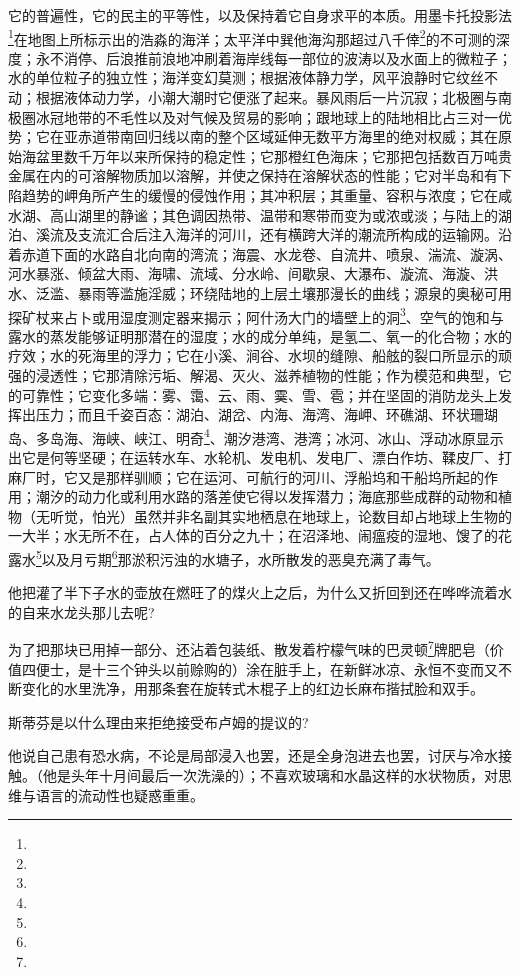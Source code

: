 \par 它的普遍性，它的民主的平等性，以及保持着它自身求平的本质。用墨卡托投影法\footnote{}在地图上所标示出的浩淼的海洋；太平洋中巽他海沟那超过八千倖\footnote{}的不可测的深度；永不消停、后浪推前浪地冲刷着海岸线每一部位的波涛以及水面上的微粒子；水的单位粒子的独立性；海洋变幻莫测；根据液体静力学，风平浪静时它纹丝不动；根据液体动力学，小潮大潮时它便涨了起来。暴风雨后一片沉寂；北极圈与南极圈冰冠地带的不毛性以及对气候及贸易的影响；跟地球上的陆地相比占三对一优势；它在亚赤道带南回归线以南的整个区域延伸无数平方海里的绝对权威；其在原始海盆里数千万年以来所保持的稳定性；它那橙红色海床；它那把包括数百万吨贵金属在内的可溶解物质加以溶解，并使之保持在溶解状态的性能；它对半岛和有下陷趋势的岬角所产生的缓慢的侵蚀作用；其冲积层；其重量、容积与浓度；它在咸水湖、高山湖里的静谧；其色调因热带、温带和寒带而变为或浓或淡；与陆上的湖泊、溪流及支流汇合后注入海洋的河川，还有横跨大洋的潮流所构成的运输网。沿着赤道下面的水路自北向南的湾流；海震、水龙卷、自流井、喷泉、湍流、漩涡、河水暴涨、倾盆大雨、海啸、流域、分水岭、间歇泉、大瀑布、漩流、海漩、洪水、泛滥、暴雨等滥施淫威；环绕陆地的上层土壤那漫长的曲线；源泉的奥秘可用探矿杖来占卜或用湿度测定器来揭示；阿什汤大门的墙壁上的洞\footnote{}、空气的饱和与露水的蒸发能够证明那潜在的湿度；水的成分单纯，是氢二、氧一的化合物；水的疗效；水的死海里的浮力；它在小溪、涧谷、水坝的缝隙、船舷的裂口所显示的顽强的浸透性；它那清除污垢、解渴、灭火、滋养植物的性能；作为模范和典型，它的可靠性；它变化多端：雾、霭、云、雨、霙、雪、雹；并在坚固的消防龙头上发挥出压力；而且千姿百态：湖泊、湖岔、内海、海湾、海岬、环礁湖、环状珊瑚岛、多岛海、海峡、峡江、明奇\footnote{}、潮汐港湾、港湾；冰河、冰山、浮动冰原显示出它是何等坚硬；在运转水车、水轮机、发电机、发电厂、漂白作坊、鞣皮厂、打麻厂时，它又是那样驯顺；它在运河、可航行的河川、浮船坞和干船坞所起的作用；潮汐的动力化或利用水路的落差使它得以发挥潜力；海底那些成群的动物和植物（无听觉，怕光）虽然并非名副其实地栖息在地球上，论数目却占地球上生物的一大半；水无所不在，占人体的百分之九十；在沼泽地、闹瘟疫的湿地、馊了的花露水\footnote{}以及月亏期\footnote{}那淤积污浊的水塘子，水所散发的恶臭充满了毒气。
\par 他把灌了半下子水的壶放在燃旺了的煤火上之后，为什么又折回到还在哗哗流着水的自来水龙头那儿去呢?
\par 为了把那块已用掉一部分、还沾着包装纸、散发着柠檬气味的巴灵顿\footnote{}牌肥皂（价值四便士，是十三个钟头以前赊购的）涂在脏手上，在新鲜冰凉、永恒不变而又不断变化的水里洗净，用那条套在旋转式木棍子上的红边长麻布揩拭脸和双手。
\par 斯蒂芬是以什么理由来拒绝接受布卢姆的提议的?
\par 他说自己患有恐水病，不论是局部浸入也罢，还是全身泡进去也罢，讨厌与冷水接触。（他是头年十月间最后一次洗澡的）；不喜欢玻璃和水晶这样的水状物质，对思维与语言的流动性也疑惑重重。
